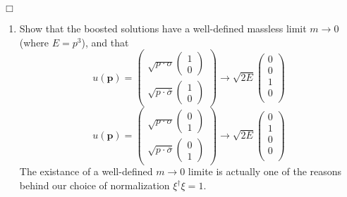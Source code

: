 \documentclass[12pt]{article}
\newcommand{\qedwhite}{\hfill \ensuremath{\Box}}
\begin{document}
\qedwhite

\color{black}

\begin{enumerate}[label=(\alph*), start = 4]
    \item Show that the boosted solutions have a well-defined massless limit $m\rightarrow 0$ (where $E=p^3$), and that
        \[
            u(\mathbf{p}) = 
                \begin{pmatrix}
                    \sqrt{p\cdot \sigma}\begin{pmatrix}1 \\ 0\end{pmatrix} \\
                    \sqrt{p\cdot \overline{\sigma}}\begin{pmatrix}1 \\ 0\end{pmatrix}
                    \end{pmatrix} \rightarrow \sqrt{2E}\begin{pmatrix}
                    0\\
                    0\\
                    1\\
                    0\\
                \end{pmatrix}
        \]
        \[
            u(\mathbf{p}) = 
                \begin{pmatrix}
                    \sqrt{p\cdot \sigma}\begin{pmatrix}0 \\ 1\end{pmatrix} \\
                    \sqrt{p\cdot \overline{\sigma}}\begin{pmatrix}0 \\ 1\end{pmatrix}
                    \end{pmatrix} \rightarrow \sqrt{2E}\begin{pmatrix}
                    0\\
                    1\\
                    0\\
                    0\\
                \end{pmatrix}
        \]
        The existance of a well-defined $m\rightarrow 0$ limite is actually one of the reasons behind our choice of normalization $\xi^\dagger \xi = 1$.

\end{enumerate}
\end{document}
